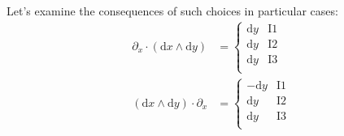 \documentclass[\ifafour a4paper,12pt,\else a5paper,10pt,\fi%
onecolumn,oneside,article,%
british%
]{memoir}
\theoremstyle{remark}
\theoremstyle{innote}
\newcommand*{\de}{\partialup}%
\newcommand*{\di}{\mathrm{d}}%
\renewcommand*{\|}[1][]{\nonscript\:#1\vert\nonscript\:\mathopen{}}
\begin{document}
Let's examine the consequences of such choices in particular cases:
\begin{align}
  \label{eq:examples_choices_inner_two_x1}
 \de_{x} \cdot (\di x \land \di y)  &=
  \begin{cases}
    \di y &\text{I1}\\
    \di y &\text{I2}\\
    \di y &\text{I3}\\
  \end{cases}
  \\
  \label{eq:examples_choices_inner_two_x2}
  (\di x \land \di y) \cdot \de_{x} &=
  \begin{cases}
    -\di y &\text{I1}\\
    \di y &\text{I2}\\
    \di y &\text{I3}\\
  \end{cases}
  \\

\end{align}
\end{document}
